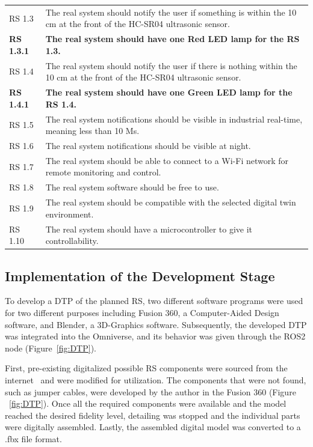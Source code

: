 \documentclass[conference]{IEEEtran}
\begin{document}
\begin{table}[htbp]
\begin{tabular}{p{1cm} p{5.7cm}}
            RS 1.3 & The real system should notify the user if something is within the 10 cm at the front of the HC-SR04 ultrasonic sensor. \\
            \textbf{RS 1.3.1} & \textbf{The real system should have one Red LED lamp for the RS 1.3.} \\
            RS 1.4 & The real system should notify the user if there is nothing within the 10 cm at the front of the HC-SR04 ultrasonic sensor. \\
            \textbf{RS 1.4.1} & \textbf{The real system should have one Green LED lamp for the RS 1.4.} \\
            RS 1.5 & The real system notifications should be visible in industrial real-time, meaning less than 10 Ms.\\
            RS 1.6 & The real system notifications should be visible at night.\\
            RS 1.7 & The real system should be able to connect to a Wi-Fi network for remote monitoring and control.\\
            RS 1.8 & The real system software should be free to use.\\
            RS 1.9 & The real system should be compatible with the selected digital twin environment.\\
            RS 1.10 & The real system should have a microcontroller to give it controllability.\\
        \end{tabular}
    \end{table}


    \subsection{Implementation of the Development Stage}
    To develop a DTP of the planned RS, two different software programs were used for two different purposes including Fusion 360, a 
    Computer-Aided Design software, and Blender, a 3D-Graphics software. Subsequently, the developed DTP was integrated into the Omniverse, 
    and its behavior was given through the ROS2 node (Figure~\ref{fig:DTP}).

    First, pre-existing digitalized possible RS components were sourced from the internet~\cite{GrabCAD} and were modified for utilization. 
    The components that were not found, such as jumper cables, were developed by the author in the Fusion 360 (Figure ~\ref{fig:DTP}). Once all the required components 
    were available and the model reached the desired fidelity level, 
    detailing was stopped and the individual parts were digitally assembled. Lastly, the assembled digital model was converted to a .fbx file format.
    
\end{document}
